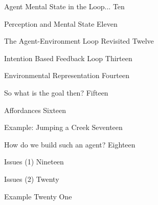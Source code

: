 \documentclass[xcolor=dvipsnames,t]{beamer}
\begin{document}
\begin{frame}{Agent Mental State in the Loop...}
Ten
\end{frame} 

\begin{frame}{Perception and Mental State}
Eleven
\end{frame} 

\begin{frame}{The Agent-Environment Loop Revisited}
Twelve
\end{frame} 

\begin{frame}{Intention Based Feedback Loop}
Thirteen
\end{frame} 

\begin{frame}{Environmental Representation} 
Fourteen
\end{frame} 

\begin{frame}{So what is the goal then?}
Fifteen
\end{frame} 

\begin{frame}{Affordances}
Sixteen
\end{frame} 

\begin{frame}{Example: Jumping a Creek} 
Seventeen
\end{frame} 

\begin{frame}{How do we build such an agent?}
Eighteen
\end{frame} 

\begin{frame}{Issues (1)}
Nineteen
\end{frame} 

\begin{frame}{Issues (2)}
Twenty
\end{frame} 

\begin{frame}{Example} 
Twenty One
\end{frame} 
\end{document}
